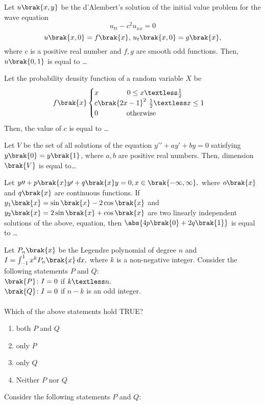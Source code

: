     \item Let $u\brak{x,y}$ be the d'Alembert's solution of the initial value problem for the wave equation 
            $$u_{tt}-c^2u_{xx}=0$$
            $$u\brak{x,0}=f\brak{x},\,u_t\brak{x,0}=g\brak{x},$$
            where $c$ is a positive real number and $f,g$ are smooth odd functions. Then, $u\brak{0,1}$ is equal to \dots
    \item Let the probability density function of a random variable $X$ be 
        $$f\brak{x}
        \begin{cases}
            x \quad\quad\quad\quad 0\leq x\textless \frac{1}{2}\\
            c\brak{2x-1}^2 \text{    } \frac{1}{2}\textless x \leq 1\\
            0 \text{\quad\quad\quad\quad otherwise}
        \end{cases}
        $$
        Then, the value of $c$ is equal to \dots 
    \item Let $V$ be the set of all solutions of the equation $y\prime\prime+ay\prime+by=0$ satisfying $y\brak{0} =y\brak{1}$, where $a,b$ are positive real numbers. Then, dimension$\brak{V}$ is equal to\dots
    \item Let $y\prime\prime+p\brak{x}y\prime+q\brak{x}y=0,x\in\brak{-\infty,\infty},$ where $o\brak{x}$ and $q\brak{x}$ are continuous functions. If $y_1\brak{x}=\sin\brak{x}-2\cos\brak{x}$ and $y_2\brak{x}=2\sin\brak{x}+\cos\brak{x}$ are two linearly independent solutions of the above, equation, then $\abs{4p\brak{0}+2q\brak{1}}$ is equal to \dots
    \item Let $P_n\brak{x}$ be the Legendre polynomial of degree $n$ and $I=\int_{-1}^{1}x^kP_n\brak{x}\,dx,$ where $k$ is a non-negative integer. Consider the following statements $P$ and $Q\colon$\\
    $\brak{P}\colon I=0$ if $k\textless n.$\\
    $\brak{Q}\colon I=0$ if $n-k$ is an odd integer.\\ \\
    Which of the above statements hold TRUE?
    \begin{enumerate}
        \item both $P$ and $Q$
        \item only $P$
        \item only $Q$
        \item Neither $P$ nor $Q$
    \end{enumerate}
    \item Consider the following statements $P$ and $Q\colon$\\
